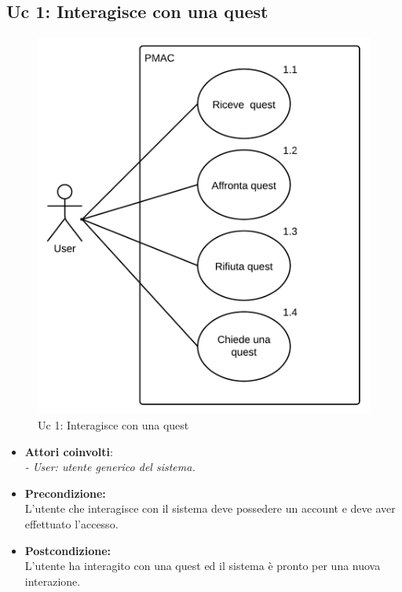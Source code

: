 {\subsection{Uc 1: Interagisce con una quest}
\begin{figure}[ht]
\centering
\caption{Uc 1: Interagisce con una quest}
\includegraphics[scale=0.8]{images/cap1/UseCase/Uc1} %
\end{figure}

\begin{itemize}
\item \textbf{Attori coinvolti}:\\
\emph{- User: utente generico del sistema.}

\item \textbf{Precondizione:}\\
L'utente che interagisce con il sistema deve possedere un account e deve aver effettuato l'accesso.

\item \textbf{Postcondizione:}\\
L'utente ha interagito con una quest ed il sistema è pronto per una nuova interazione.


\end{itemize}}
